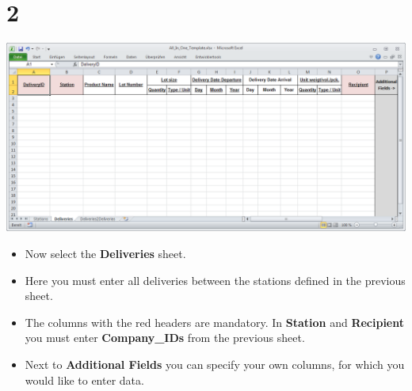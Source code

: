 \documentclass{beamer}
\begin{document}
\section{2}
\begin{frame}
	\begin{center}
  		\includegraphics[height=0.5\textheight]{2.png}
	\end{center}
	\begin{itemize}
		\item Now select the \textbf{Deliveries} sheet.
		\item Here you must enter all deliveries between the stations defined in the previous sheet.
		\item The columns with the red headers are mandatory. In \textbf{Station} and \textbf{Recipient} you must enter \textbf{Company\_IDs} from the previous sheet.
		\item Next to \textbf{Additional Fields} you can specify your own columns, for which you would like to enter data.
	\end{itemize}
\end{frame}
\end{document}
